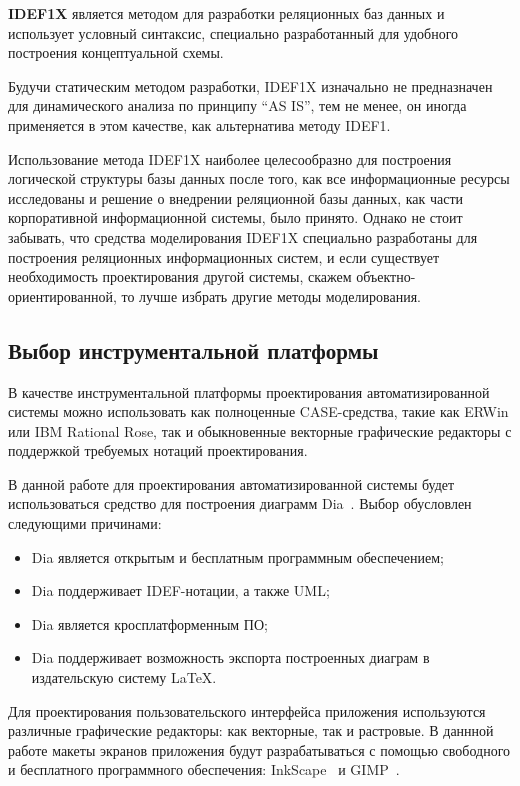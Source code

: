 \textbf{IDEF1X} является методом для разработки реляционных баз данных и
использует условный синтаксис, специально разработанный для удобного
построения концептуальной схемы.

Будучи статическим методом разработки, IDEF1X изначально не
предназначен для динамического анализа по принципу ``AS IS'', тем не менее,
он иногда применяется в этом качестве, как альтернатива методу IDEF1.

Использование метода IDEF1X наиболее целесообразно для построения
логической структуры базы данных после того, как все информационные
ресурсы исследованы и решение о
внедрении реляционной базы данных, как части корпоративной
информационной системы, было принято.
Однако не стоит забывать, что
средства моделирования IDEF1X специально разработаны для построения
реляционных информационных систем, и если существует необходимость
проектирования другой системы, скажем объектно-ориентированной, то
лучше избрать другие методы моделирования.

\pagebreak
\subsection{Выбор инструментальной платформы}

В качестве инструментальной платформы проектирования автоматизированной
системы можно использовать как полноценные CASE-средства, такие как ERWin или
IBM Rational Rose, так и обыкновенные векторные графические редакторы с поддержкой
требуемых нотаций проектирования.

В данной работе для проектирования автоматизированной системы будет
использоваться средство для построения диаграмм Dia~\cite{website_dia}. Выбор обусловлен
следующими причинами:
\begin{itemize}
  \item Dia является открытым и бесплатным программным обеспечением;
  \item Dia поддерживает IDEF-нотации, а также UML;
  \item Dia является кросплатформенным ПО;
  \item Dia поддерживает возможность экспорта построенных диаграм в
    издательскую систему LaTeX.
\end{itemize}

Для проектирования пользовательского интерфейса приложения используются
различные графические редакторы: как векторные, так и растровые.
В даннной работе макеты экранов приложения будут разрабатываться с помощью
свободного и бесплатного программного обеспечения:
InkScape~\cite{website_inkscape} и GIMP~\cite{website_gimp}.